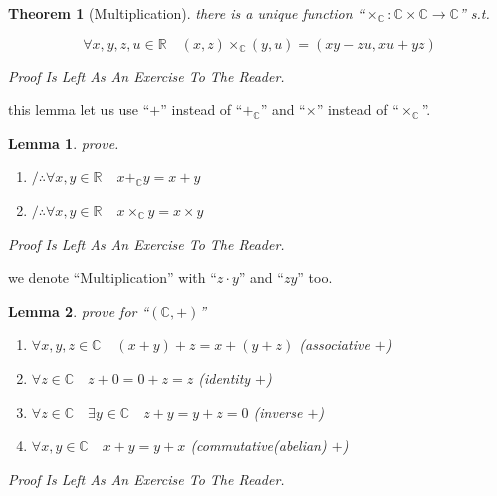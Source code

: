 \documentclass[10pt,a4paper]{book}
\newtheorem{theorem}{Theorem}[section]
\newtheorem{lemma}{Lemma}[section]
\begin{document}
\begin{theorem}[Multiplication] there is a unique function ``$\times_\mathbb{C} :\mathbb{C} \times \mathbb{C} \to \mathbb{C}$'' s.t.

    \[ \forall x , y , z , u \in \mathbb{R} \quad (x , z) \times_\mathbb{C} (y , u)  = (x y  - z u , x u + y z) \]

    Proof Is Left As An Exercise To The Reader.
\end{theorem}

this lemma let us use ``$+$'' instead of ``$+_\mathbb{C}$'' and ``$\times$''
instead of ``$\times_\mathbb{C}$''.

\begin{lemma}prove.
    \begin{enumerate}
        \setlength{\itemsep}{0pt} %
        \item       $/ \therefore   \forall x,y \in \mathbb{R} \quad x +_\mathbb{C} y  = x  + y$
        \item       $/ \therefore   \forall x,y \in \mathbb{R} \quad x \times_\mathbb{C} y  = x  \times y$
    \end{enumerate}
    Proof Is Left As An Exercise To The Reader.
\end{lemma}

we denote ``Multiplication'' with ``$z \cdot y$'' and ``$z y$'' too.

\begin{lemma}prove for  ``$ (\mathbb{C} , +  )  $''
    \begin{enumerate}
        \setlength{\itemsep}{0pt} %
        \item       $\forall x ,y ,z  \in \mathbb{C} \quad (x + y )+ z  = x + (y + z )  $ (associative $+ $)
        \item       $\forall z \in \mathbb{C} \quad z +  0 = 0 +  z = z$ (identity  $+ $)
        \item       $\forall z \in \mathbb{C} \quad \exists y \in \mathbb{C} \quad z +  y = y +  z = 0$  (inverse  $+ $)
        \item       $\forall x ,y  \in \mathbb{C} \quad x + y  = y + x $   (commutative(abelian)  $+ $)
    \end{enumerate}
    Proof Is Left As An Exercise To The Reader.
\end{lemma}
\end{document}
